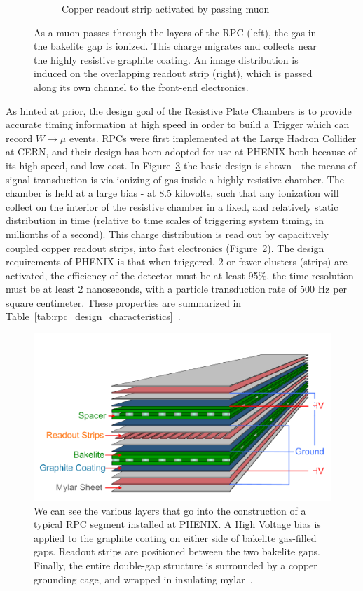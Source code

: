 \begin{figure}
\begin{subfigure}[b]{0.4\textwidth}
    \caption{Copper readout strip activated by passing muon}
    \label{fig:rpc_hit_top_view}
  \end{subfigure}
  \caption{
    As a muon passes through the layers of the RPC (left), the gas in the
    bakelite gap is ionized. This charge migrates and collects near the highly
    resistive graphite coating. An image distribution is induced on the
    overlapping readout strip (right), which is passed along its own channel to
    the front-end electronics.
  }
  \label{fig:muon_hit_rpc}
\end{figure}

As hinted at prior, the design goal of the Resistive Plate Chambers is to
provide accurate timing information at high speed in order to build a Trigger
which can record $W\rightarrow\mu$ events. RPCs were first implemented at the
Large Hadron Collider at CERN, and their design has been adopted for use at
PHENIX both because of its high speed, and low cost. In
Figure~\ref{fig:rpc_exploded} the basic design is shown - the means of signal
transduction is via ionizing of gas inside a highly resistive chamber. The
chamber is held at a large bias - at 8.5 kilovolts, such that any ionization
will collect on the interior of the resistive chamber in a fixed, and relatively
static distribution in time (relative to time scales of triggering system
timing, in millionths of a second). This charge distribution is read out by
capacitively coupled copper readout strips, into fast electronics
(Figure~\ref{fig:muon_hit_rpc}). The design requirements of PHENIX is that when
triggered, 2 or fewer clusters (strips) are activated, the efficiency of the
detector must be at least 95\%, the time resolution must be at least 2
nanoseconds, with a particle transduction rate of 500 Hz per square centimeter.
These properties are summarized in
Table~\ref{tab:rpc_design_characteristics}~\cite{Fukao2011}.

\begin{figure}[ht]
  \centering
  \includegraphics[width=0.7\linewidth]{./figures/rpc_exploded.png}
  \caption{
    We can see the various layers that go into the construction of a typical RPC
    segment installed at PHENIX. A High Voltage bias is applied to the graphite
    coating on either side of bakelite gas-filled gaps. Readout strips are
    positioned between the two bakelite gaps. Finally, the entire double-gap
    structure is surrounded by a copper grounding cage, and wrapped in
    insulating mylar~\cite{Fukao2011}.
  }
  \label{fig:rpc_exploded}
\end{figure}


